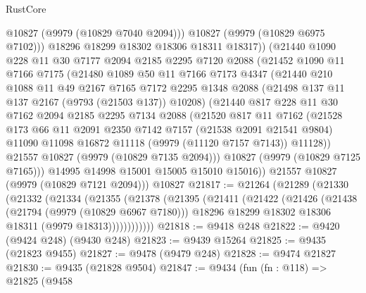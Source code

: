 \begin{lexlean}{RustCore}
\begin{coremodule}
            @10827
            (@9979 (@10829 @7040 @2094)))
          @10827
          (@9979 (@10829 @6975 @7102)))
        @18296
        @18299
        @18302
        @18306
        @18311
        @18317))
    (@21440
      @1090
      @228
      @11
      @30
      @7177
      @2094
      @2185
      @2295
      @7120
      @2088
      (@21452
        @1090
        @11
        @7166
        @7175
        (@21480
          @1089
          @50
          @11
          @7166
          @7173
          @4347
          (@21440
            @210
            @1088
            @11
            @49
            @2167
            @7165
            @7172
            @2295
            @1348
            @2088
            (@21498 @137 @11 @137 @2167 (@9793 (@21503 @137)) @10208)
            (@21440
              @817
              @228
              @11
              @30
              @7162
              @2094
              @2185
              @2295
              @7134
              @2088
              (@21520
                @817
                @11
                @7162
                (@21528
                  @173
                  @66
                  @11
                  @2091
                  @2350
                  @7142
                  @7157
                  (@21538 @2091 @21541 @9804)
                  @11090
                  @11098
                  @16872
                  @11118
                  (@9979 (@11120 @7157 @7143))
                  @11128))
              @21557
              @10827
              (@9979 (@10829 @7135 @2094)))
            @10827
            (@9979 (@10829 @7125 @7165)))
          @14995
          @14998
          @15001
          @15005
          @15010
          @15016))
      @21557
      @10827
      (@9979 (@10829 @7121 @2094)))
    @10827
@21817 := @21264
    (@21289
      (@21330
        (@21332
          (@21334
            (@21355
              (@21378
                (@21395
                  (@21411
                    (@21422
                      (@21426
                        (@21438
                          (@21794 (@9979 (@10829 @6967 @7180)))
                          @18296
                          @18299
                          @18302
                          @18306
                          @18311
                          (@9979 @18313))))))))))))
@21818 := @9418 @248
@21822 := @9420 (@9424 @248) (@9430 @248)
@21823 := @9439 @15264
@21825 := @9435 (@21823 @9455)
@21827 := @9478 (@9479 @248)
@21828 := @9474 @21827
@21830 := @9435 (@21828 @9504)
@21847 := @9434
    (fun (fn : @118) =>
    @21825
      (@9458

\end{coremodule}
\end{lexlean}
